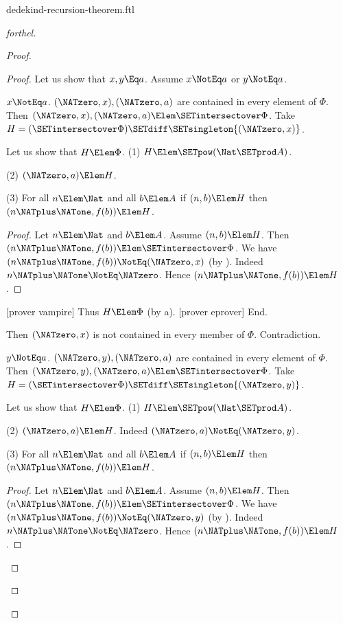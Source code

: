 \documentclass{stex}
\begin{document}
\begin{smodule}{dedekind-recursion-theorem.ftl}
\begin{proof}[forthel]
\begin{proof}
\begin{proof}
        Let us show that $x, y \Eq a$.
          Assume $x \NotEq a$ or $y \NotEq a$.

          \begin{case}{$x \NotEq a$.}
            $(\NATzero,x), (\NATzero,a)$ are contained in every element of $\Phi$.
            Then $(\NATzero,x), (\NATzero,a) \Elem \SETintersectover \Phi$.
            Take $H = (\SETintersectover \Phi) \SETdiff \SETsingleton{(\NATzero,x)}$.

            Let us show that $H \Elem \Phi$.
              (1) $H \Elem \SETpow(\Nat \SETprod A)$.

              (2) $(\NATzero,a) \Elem H$.

              (3) For all $n \Elem \Nat$ and all $b \Elem A$ if
              $(n,b) \Elem H$ then $(n \NATplus \NATone, f(b)) \Elem H$.
              \begin{proof}
                Let $n \Elem \Nat$ and $b \Elem A$.
                Assume $(n,b) \Elem H$.
                Then $(n \NATplus \NATone, f(b)) \Elem \SETintersectover \Phi$.
                We have $(n \NATplus \NATone, f(b)) \NotEq (\NATzero,x)$ (by ).
                Indeed $n \NATplus \NATone \NotEq \NATzero$.
                Hence $(n \NATplus \NATone, f(b)) \Elem H$.
              \end{proof}

              [prover vampire]
              Thus $H \Elem \Phi$ (by a).
              [prover eprover]
            End.

            Then $(\NATzero,x)$ is not contained in every member of $\Phi$.
            Contradiction.
          \end{case}

          \begin{case}{$y \NotEq a$.}
            $(\NATzero,y), (\NATzero,a)$ are contained in every element of $\Phi$.
            Then $(\NATzero,y), (\NATzero,a) \Elem \SETintersectover \Phi$.
            Take $H = (\SETintersectover \Phi) \SETdiff \SETsingleton{(\NATzero,y)}$.

            Let us show that $H \Elem \Phi$.
              (1) $H \Elem \SETpow(\Nat \SETprod A)$.

              (2) $(\NATzero,a) \Elem H$.
              Indeed $(\NATzero,a) \NotEq (\NATzero,y)$.

              (3) For all $n \Elem \Nat$ and all $b \Elem A$ if
              $(n,b) \Elem H$ then $(n \NATplus \NATone, f(b)) \Elem H$.
              \begin{proof}
                Let $n \Elem \Nat$ and $b \Elem A$.
                Assume $(n,b) \Elem H$.
                Then $(n \NATplus \NATone, f(b)) \Elem \SETintersectover \Phi$.
                We have $(n \NATplus \NATone, f(b)) \NotEq (\NATzero,y)$ (by ).
                Indeed $n \NATplus \NATone \NotEq \NATzero$.
                Hence $(n \NATplus \NATone, f(b)) \Elem H$.
              \end{proof}


\end{case}
\end{proof}
\end{proof}
\end{proof}
\end{smodule}
\end{document}

